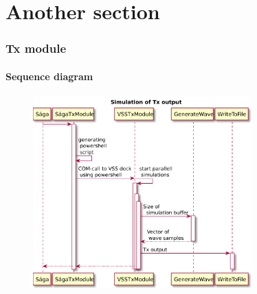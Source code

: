 \documentclass[11pt]{beamer} %
\begin{document}
\section{Another section}
\begin{frame}
 \frametitle{Tx module}
 \framesubtitle{Sequence diagram}

\begin{figure}
\includegraphics[width=0.75\textwidth]{figures/UML/uml_SagaTx.pdf}
\end{figure}

\end{frame}
\end{document}
